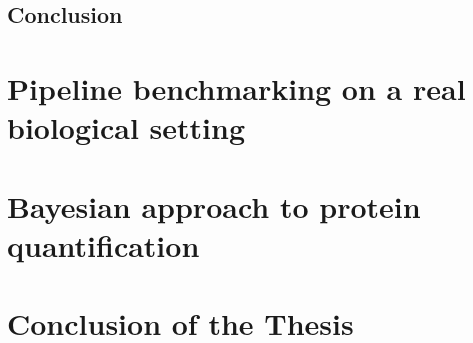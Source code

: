 \documentclass[11pt, a4paper]{report}
\begin{document}
\section{Conclusion}


\chapter{Pipeline benchmarking on a real biological setting}
\label{chap:benchmark}

\chapter{Bayesian approach to protein quantification}
\label{chap:model}


\chapter{Conclusion of the Thesis}
\label{chap:conclusion}
\end{document}
